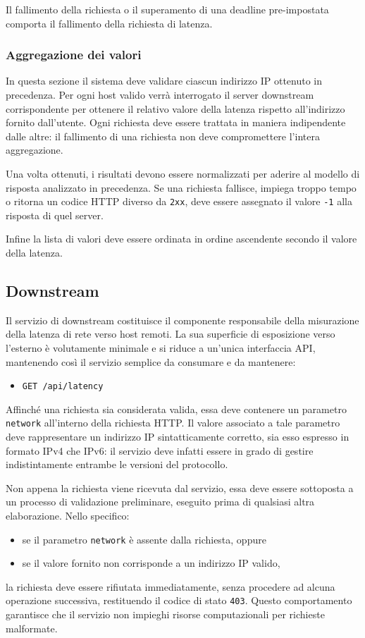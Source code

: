 Il fallimento della richiesta o il superamento di una deadline pre-impostata comporta il fallimento della richiesta di latenza.

\subsubsection{Aggregazione dei valori}
In questa sezione il sistema deve validare ciascun indirizzo \ac{IP} ottenuto in precedenza.
Per ogni host valido verrà interrogato il server downstream corrispondente per ottenere il relativo valore della latenza rispetto all'indirizzo fornito dall'utente.
Ogni richiesta deve essere trattata in maniera indipendente dalle altre: il fallimento di una richiesta non deve compromettere l'intera aggregazione.

Una volta ottenuti, i risultati devono essere normalizzati per aderire al modello di risposta analizzato in precedenza.
Se una richiesta fallisce, impiega troppo tempo o ritorna un codice \ac{HTTP} diverso da \texttt{2xx}, deve essere assegnato il valore \texttt{-1} alla risposta di quel server.

Infine la lista di valori deve essere ordinata in ordine ascendente secondo il valore della latenza.
\subsection{Downstream}
\label{subsec:downstream-analysis}

Il servizio di downstream costituisce il componente responsabile della misurazione della latenza di rete verso host remoti. La sua superficie di esposizione verso l'esterno è volutamente minimale e si riduce a un'unica interfaccia \ac{API}, mantenendo così il servizio semplice da consumare e da mantenere:
\begin{itemize}
    \item \texttt{GET /api/latency}
\end{itemize}

Affinché una richiesta sia considerata valida, essa deve contenere un parametro \texttt{network} all'interno della richiesta \ac{HTTP}. Il valore associato a tale parametro deve rappresentare un indirizzo \ac{IP} sintatticamente corretto, sia esso espresso in formato IPv4 che IPv6: il servizio deve infatti essere in grado di gestire indistintamente entrambe le versioni del protocollo.

Non appena la richiesta viene ricevuta dal servizio, essa deve essere sottoposta a un processo di validazione preliminare, eseguito prima di qualsiasi altra elaborazione. Nello specifico:
\begin{itemize}
    \item se il parametro \texttt{network} è assente dalla richiesta, oppure
    \item se il valore fornito non corrisponde a un indirizzo \ac{IP} valido,
\end{itemize}
la richiesta deve essere rifiutata immediatamente, senza procedere ad alcuna operazione successiva, restituendo il codice di stato \texttt{403}. Questo comportamento garantisce che il servizio non impieghi risorse computazionali per richieste malformate.

